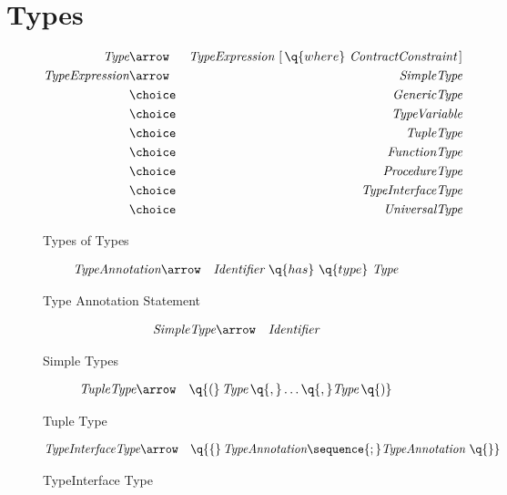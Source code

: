 \section{Types}

\begin{figure}[htbp]
\begin{eqnarray*}
\emph{Type}&\arrow&\emph{TypeExpression}\ [\,\q{where}\ \emph{ContractConstraint}\,]\\
\emph{TypeExpression}&\arrow&\emph{SimpleType}\\
&\choice&\emph{GenericType}\\
&\choice&\emph{TypeVariable}\\
&\choice&\emph{TupleType}\\
&\choice&\emph{FunctionType}\\
&\choice&\emph{ProcedureType}\\
&\choice&\emph{TypeInterfaceType}\\
&\choice&\emph{UniversalType}
\end{eqnarray*}
\caption{Types of Types}
\label{typeFig}
\end{figure}


\begin{figure}[hbp]
\begin{eqnarray*}
\emph{TypeAnnotation}&\arrow&\emph{Identifier}\ \q{has}\ \q{type}\ \emph{Type}
\end{eqnarray*}
\caption{Type Annotation Statement}
\label{typeAnnotationFig}
\end{figure}

\begin{figure}[htbp]
\begin{eqnarray*}
\emph{SimpleType}&\arrow&\emph{Identifier}
\end{eqnarray*}
\caption{Simple Types}
\label{simpleTypeFig}
\end{figure}

\begin{figure}[htbp]
\begin{eqnarray*}
\emph{TupleType}&\arrow&\q{(}\,\emph{Type}\,\q{,}\ldots\q{,} \emph{Type}\,\q{)}
\end{eqnarray*}
\caption{Tuple Type}
\label{tupleTypeFig}
\end{figure}

\begin{figure}[htbp]
\begin{eqnarray*}
\emph{TypeInterfaceType}&\arrow&\q{\{}\,\emph{TypeAnnotation}\sequence{;}\emph{TypeAnnotation}\ \q{\}}
\end{eqnarray*}
\caption{TypeInterface Type}
\label{typeInterfaceTypeFig}
\end{figure}

